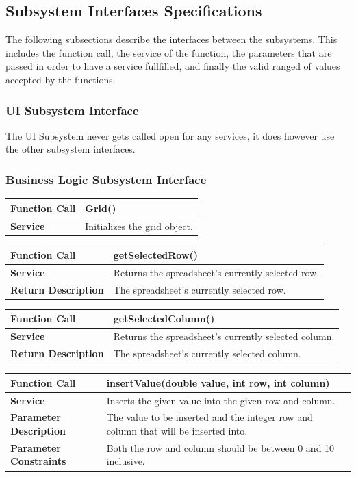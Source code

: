 \documentclass[12pt]{article}
\begin{document}
\subsection{Subsystem Interfaces Specifications}
The following subsections describe the interfaces between the subsystems. This includes the function call, the service of the function, the parameters that are passed in order to have a service fullfilled, and finally the valid ranged of values accepted by the functions.
\subsubsection{UI Subsystem Interface}
The UI Subsystem never gets called open for any services, it does however use the other subsystem interfaces.
\subsubsection{Business Logic Subsystem Interface}

\begin{tabular}{|p{4.75cm}|p{11.25cm}|}
\hline
\textbf{Function Call} & Grid()
\\\hline
\textbf{Service} & Initializes the grid object.
\\\hline
\end{tabular}

\begin{tabular}{|p{4.75cm}|p{11.25cm}|}
\hline
\textbf{Function Call} & getSelectedRow()
\\\hline
\textbf{Service} & Returns the spreadsheet's currently selected row.
\\\hline
\textbf{Return Description} & The spreadsheet's currently selected row.
\\\hline
\end{tabular}

\begin{tabular}{|p{4.75cm}|p{11.25cm}|}
\hline
\textbf{Function Call} & getSelectedColumn()
\\\hline
\textbf{Service} & Returns the spreadsheet's currently selected column.
\\\hline
\textbf{Return Description} & The spreadsheet's currently selected column.
\\\hline
\end{tabular}

\begin{tabular}{|p{4.75cm}|p{11.25cm}|}
\hline
\textbf{Function Call} & insertValue(double value, int row, int column)
\\\hline
\textbf{Service} & Inserts the given value into the given row and column.
\\\hline
\textbf{Parameter Description} & The value to be inserted and the integer row and column that will be inserted into.
\\\hline
\textbf{Parameter Constraints} & Both the row and column should be between 0 and 10 inclusive.
\\\hline
\end{tabular}
\end{document}
